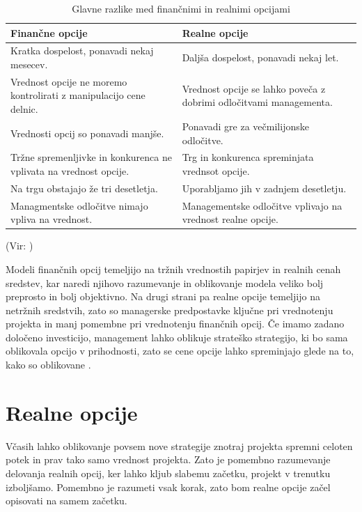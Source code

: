 \begin{table}[ht]
	\caption{Glavne razlike med finančnimi in realnimi opcijami}
	\centering
	\begin{tabular}{|L|L|}
	\hline
	\textbf{Finančne opcije}&\textbf{Realne opcije}\\
	\hline
	\hline
	Kratka dospelost, ponavadi nekaj mesecev. & Daljša dospelost, ponavadi nekaj let. \\
	\hline
	Vrednost opcije ne moremo kontrolirati z manipulacijo cene delnic. & Vrednost opcije se lahko poveča z dobrimi odločitvami managementa. \\
	\hline
	 Vrednosti opcij so ponavadi manjše. & Ponavadi gre za večmilijonske odločitve. \\
	\hline
	Tržne spremenljivke in konkurenca ne vplivata na vrednost opcije. & Trg in konkurenca spreminjata vrednsot opcije. \\
	\hline
	Na trgu obstajajo že tri desetletja. & Uporabljamo jih v zadnjem desetletju. \\
	\hline
	Managmentske odločitve nimajo vpliva na vrednost. & Managementske odločitve vplivajo na vrednost realne opcije. \\
	\hline
\end{tabular}
	\label{table: tabela4}
\end{table}  
(Vir: \cite[str. 110]{Mun})

Modeli finančnih opcij temeljijo na tržnih vrednostih papirjev in realnih cenah sredstev, kar naredi njihovo razumevanje in oblikovanje modela veliko bolj preprosto in bolj objektivno. Na drugi strani pa realne opcije temeljijo na netržnih sredstvih, zato so managerske predpostavke ključne pri vrednotenju projekta in manj pomembne pri vrednotenju finančnih opcij. Če imamo zadano določeno investicijo, management lahko oblikuje strateško strategijo, ki bo sama oblikovala opcijo v prihodnosti, zato se cene opcije lahko spreminjajo glede na to, kako so oblikovane \cite[str. 110, 111]{Mun}. \\

\section{Realne opcije}
Včasih lahko oblikovanje povsem nove strategije znotraj projekta spremni celoten potek in prav tako samo vrednost projekta. Zato je pomembno razumevanje delovanja realnih opcij, ker lahko kljub slabemu začetku, projekt v trenutku izboljšamo. Pomembno je razumeti vsak korak, zato bom realne opcije začel opisovati na samem začetku.

